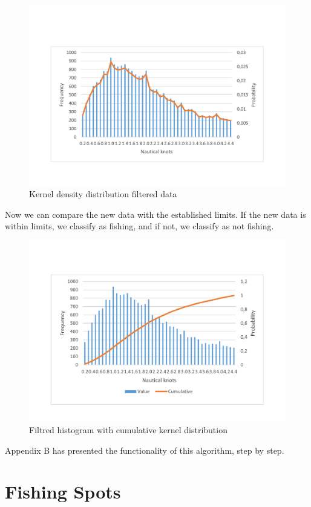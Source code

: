 \begin{figure}[H]
\centering
\includegraphics[trim=0 50 0 50,width=0.8\linewidth]{Chapters/img/hist_kernel.pdf}
\caption{Kernel density distribution filtered data}
\label{fig:hist_kernel}
\end{figure}


Now we can compare the new data with the established limits. If the new data is within limits, we classify as fishing, and if not, we classify as not fishing.

\begin{figure}[H]
\centering
\includegraphics[trim=0 50 0 50,width=0.8\linewidth]{Chapters/img/hist_comulative.pdf}
\caption{Filtred histogram with cumulative kernel distribution}
\label{fig:hist_comulative}
\end{figure}

Appendix B has presented the functionality of this algorithm, step by step. 



\section{Fishing Spots} %
\label{sub:fishing_spots}

